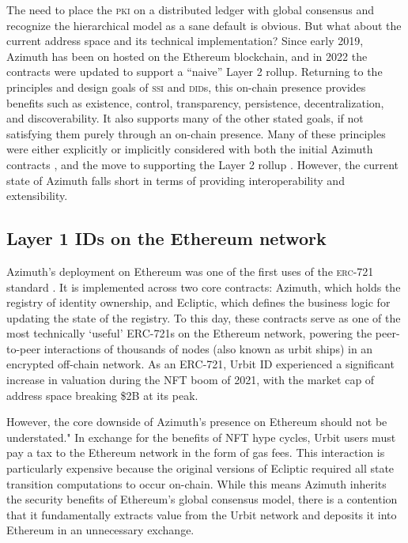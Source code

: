 \documentclass[twoside]{article}
\begin{document}
The need to place the \textsc{pki} on a distributed ledger with global consensus and recognize the hierarchical model as a sane default is obvious. But what about the current address space and its technical implementation? Since early 2019, Azimuth has been on hosted on the Ethereum blockchain, and in 2022 the contracts were updated to support a ``naive'' Layer 2 rollup. Returning to the principles and design goals of \textsc{ssi} and \textsc{did}s, this on-chain presence provides benefits such as existence, control, transparency, persistence, decentralization, and discoverability. It also supports many of the other stated goals, if not satisfying them purely through an on-chain presence. Many of these principles were either explicitly or implicitly considered with both the initial Azimuth contracts \citep{WolfePaul2019}, and the move to supporting the Layer 2 rollup \citep{Paprocki2021}. However, the current state of Azimuth falls short in terms of providing interoperability and extensibility. 

\subsection{Layer 1 IDs on the Ethereum network}

Azimuth's deployment on Ethereum was one of the first uses of the \textsc{erc}-721 standard \citep{ERC721}. It is implemented across two core contracts: Azimuth, which holds the registry of identity ownership, and Ecliptic, which defines the business logic for updating the state of the registry. To this day, these contracts serve as one of the most technically `useful' ERC-721s on the Ethereum network, powering the peer-to-peer interactions of thousands of nodes (also known as urbit ships) in an encrypted off-chain network. As an ERC-721, Urbit ID experienced a significant increase in valuation during the NFT boom of 2021, with the market cap of address space breaking \$2B at its peak.

However, the core downside of Azimuth's presence on Ethereum should not be understated." In exchange for the benefits of NFT hype cycles, Urbit users must pay a tax to the Ethereum network in the form of gas fees. This interaction is particularly expensive because the original versions of Ecliptic required all state transition computations to occur on-chain. While this means Azimuth inherits the security benefits of Ethereum's global consensus model, there is a contention that it fundamentally extracts value from the Urbit network and deposits it into Ethereum in an unnecessary exchange.
\end{document}

